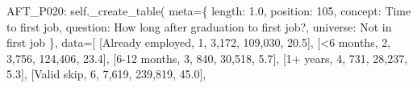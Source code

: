 \documentclass[
  11pt,
  a4paper,
]{article}
\newenvironment{Shaded}{\begin{snugshade}}{\end{snugshade}}
\newcommand{\NormalTok}[1]{\textcolor[rgb]{0.00,0.23,0.31}{#1}}
\newcommand{\OperatorTok}[1]{\textcolor[rgb]{0.37,0.37,0.37}{#1}}
\newcommand{\StringTok}[1]{\textcolor[rgb]{0.13,0.47,0.30}{#1}}
\newcommand{\VariableTok}[1]{\textcolor[rgb]{0.07,0.07,0.07}{#1}}
\begin{document}
\begin{Shaded}
\begin{Highlighting}[]
    \StringTok{\textquotesingle{}AFT\_P020\textquotesingle{}}\NormalTok{: }\VariableTok{self}\NormalTok{.\_create\_table(}
\NormalTok{        meta}\OperatorTok{=}\NormalTok{\{}
            \StringTok{\textquotesingle{}length\textquotesingle{}}\NormalTok{: }\StringTok{\textquotesingle{}1.0\textquotesingle{}}\NormalTok{, }\StringTok{\textquotesingle{}position\textquotesingle{}}\NormalTok{: }\StringTok{\textquotesingle{}105\textquotesingle{}}\NormalTok{,}
            \StringTok{\textquotesingle{}concept\textquotesingle{}}\NormalTok{: }\StringTok{\textquotesingle{}Time to first job\textquotesingle{}}\NormalTok{,}
            \StringTok{\textquotesingle{}question\textquotesingle{}}\NormalTok{: }\StringTok{\textquotesingle{}How long after graduation to first job?\textquotesingle{}}\NormalTok{,}
            \StringTok{\textquotesingle{}universe\textquotesingle{}}\NormalTok{: }\StringTok{\textquotesingle{}Not in first job\textquotesingle{}}
\NormalTok{        \},}
\NormalTok{        data}\OperatorTok{=}\NormalTok{[}
\NormalTok{            [}\StringTok{\textquotesingle{}Already employed\textquotesingle{}}\NormalTok{, }\StringTok{\textquotesingle{}1\textquotesingle{}}\NormalTok{, }\StringTok{\textquotesingle{}3,172\textquotesingle{}}\NormalTok{, }\StringTok{\textquotesingle{}109,030\textquotesingle{}}\NormalTok{, }\StringTok{\textquotesingle{}20.5\textquotesingle{}}\NormalTok{],}
\NormalTok{            [}\StringTok{\textquotesingle{}\textless{}6 months\textquotesingle{}}\NormalTok{, }\StringTok{\textquotesingle{}2\textquotesingle{}}\NormalTok{, }\StringTok{\textquotesingle{}3,756\textquotesingle{}}\NormalTok{, }\StringTok{\textquotesingle{}124,406\textquotesingle{}}\NormalTok{, }\StringTok{\textquotesingle{}23.4\textquotesingle{}}\NormalTok{],}
\NormalTok{            [}\StringTok{\textquotesingle{}6{-}12 months\textquotesingle{}}\NormalTok{, }\StringTok{\textquotesingle{}3\textquotesingle{}}\NormalTok{, }\StringTok{\textquotesingle{}840\textquotesingle{}}\NormalTok{, }\StringTok{\textquotesingle{}30,518\textquotesingle{}}\NormalTok{, }\StringTok{\textquotesingle{}5.7\textquotesingle{}}\NormalTok{],}
\NormalTok{            [}\StringTok{\textquotesingle{}1+ years\textquotesingle{}}\NormalTok{, }\StringTok{\textquotesingle{}4\textquotesingle{}}\NormalTok{, }\StringTok{\textquotesingle{}731\textquotesingle{}}\NormalTok{, }\StringTok{\textquotesingle{}28,237\textquotesingle{}}\NormalTok{, }\StringTok{\textquotesingle{}5.3\textquotesingle{}}\NormalTok{],}
\NormalTok{            [}\StringTok{\textquotesingle{}Valid skip\textquotesingle{}}\NormalTok{, }\StringTok{\textquotesingle{}6\textquotesingle{}}\NormalTok{, }\StringTok{\textquotesingle{}7,619\textquotesingle{}}\NormalTok{, }\StringTok{\textquotesingle{}239,819\textquotesingle{}}\NormalTok{, }\StringTok{\textquotesingle{}45.0\textquotesingle{}}\NormalTok{],}

\end{Highlighting}
\end{Shaded}
\end{document}
